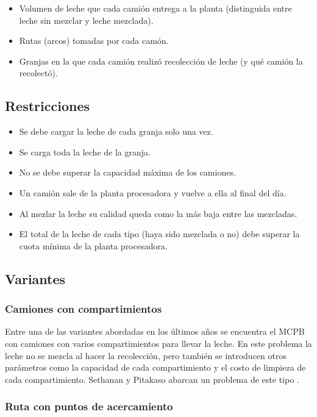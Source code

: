 \documentclass[letter, 10pt]{article}
\begin{document}
\begin{itemize}
    \item Volumen de leche que cada cami\'on entrega a la planta (distinguida entre leche sin mezclar y leche mezclada).
    \item Rutas (arcos) tomadas por cada cam\'on.
    \item Granjas en la que cada cami\'on realiz\'o recolecci\'on de leche (y qu\'e cami\'on la recolect\'o).
\end{itemize}

\subsection{Restricciones}

\begin{itemize}
    \item Se debe cargar la leche de cada granja solo una vez.
    \item Se carga toda la leche de la granja.
    \item No se debe superar la capacidad m\'axima de los camiones.
    \item Un cami\'on sale de la planta procesadora y vuelve a ella al final del d\'ia.
    \item Al mezlar la leche su calidad queda como la m\'as baja entre las mezcladas.
    \item El total de la leche de cada tipo (haya sido mezclada o no) debe superar la cuota m\'inima de la planta procesadora.
\end{itemize}

\subsection{Variantes}

\subsubsection{Camiones con compartimientos}

Entre una de las variantes abordadas en los \'ultimos a\~{n}os se encuentra el MCPB con camiones con varios compartimientos para llevar la leche. En este problema la leche no se mezcla al hacer la recolecci\'on, pero tambi\'en se introducen otros par\'ametros como la capacidad de cada compartimiento y el costo de limpieza de cada compartimiento. Sethanan y Pitakaso abarcan un problema de este tipo \cite{Compartimientos}.

\subsubsection{Ruta con puntos de acercamiento}
\end{document}
